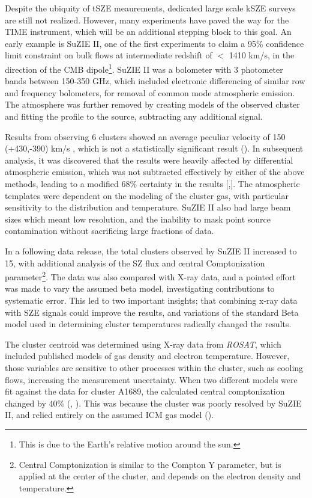 \documentclass[manuscript]{aastex}
\begin{document}
Despite the ubiquity of tSZE meaurements, dedicated large scale kSZE surveys are still not realized. However, many experiments have paved the way for the TIME instrument, which will be an additional stepping block to this goal. An early example is SuZIE II, one of the first experiments to claim a 95\% confidence limit constraint on bulk flows at intermediate redshift of \(<\) 1410 km/s, in the direction of the CMB dipole\footnote{This is due to the Earth's relative motion around the sun.}. SuZIE II was a bolometer with 3 photometer bands between 150-350 GHz, which included electronic differencing of similar row and frequency bolometers, for removal of common mode atmospheric emission. The atmosphere was further removed by creating models of the observed cluster and fitting the profile to the source, subtracting any additional signal. 

Results from observing 6 clusters showed an average peculiar velocity of 150 (+430,-390) km/s , which is not a statistically significant result (\cite{Benson2003}). In subsequent analysis, it was discovered that the results were heavily affected by differential atmospheric emission, which was not subtracted effectively by either of the above methods, leading to a modified 68\% certainty in the results [\cite{Mauskopf2000},\cite{Carlstrom2002}]. The atmospheric templates were dependent on the modeling of the cluster gas, with particular sensitivity to the distribution and temperature. SuZIE II also had large beam sizes which meant low resolution, and the inability to mask point source contamination without sacrificing large fractions of data. 

In a following data release, the total clusters observed by SuZIE II increased to 15, with additional analysis of the SZ flux and central Comptonization parameter\footnote{Central Comptonization is similar to the Compton Y parameter, but is applied at the center of the cluster, and depends on the electron density and temperature.}. The data was also compared with X-ray data, and a pointed effort was made to vary the assumed beta model, investigating contributions to systematic error. This led to two important insights; that combining x-ray data with SZE signals could improve the results, and variations of the standard Beta model used in determining cluster temperatures radically changed the results. 

The cluster centroid was determined using X-ray data from \textit{ROSAT}, which included published models of gas density and electron temperature. However, those variables are sensitive to other processes within the cluster, such as cooling flows, increasing the measurement uncertainty. When two different models were fit against the data for cluster A1689, the calculated central comptonization changed by 40\% (\cite{Holzapfel1997b}, \cite{Reese2002}). This was because the cluster was poorly resolved by SuZIE II, and relied entirely on the assumed ICM gas model (\cite{Benson2004}). 
\end{document}
